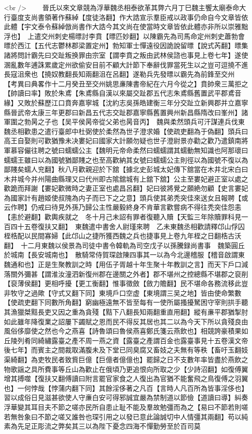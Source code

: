 <br />
　　晉氏以來文章競為浮華魏丞相泰欲革其弊六月丁巳魏主饗太廟泰命大行臺度支尚書領著作蘇綽【度徒洛翻】作大誥宣示羣臣戒以政事仍命自今文章皆依此體【宇文泰令蘇綽倣尚書作大誥今其文尚在使當時文章皆依此體亦非所以崇雅黜浮也】　上遣交州刺史楊㬓討李賁【㬓匹妙翻】以陳霸先為司馬命定州刺史蕭勃會㬓於西江【五代志鬱林郡梁置定州】勃知軍士憚遠役因詭說留㬓【說式芮翻】㬓集諸將問計霸先曰交趾叛换罪由宗室【謂李賁之叛由武林侯諮也事見上卷七年】遂使溷亂數年逋誅累歲定州欲偷安目前不顧大計節下奉辭伐罪當死生以之豈可逗撓不進長寇沮衆也【撓奴教翻長知兩翻沮在呂翻】遂勒兵先發㬓以霸先為前鋒至交州　【考異曰典畧作十二月癸丑至交州姚思亷陳書帝紀在六月今從之】賁帥衆三萬拒之【帥讀曰率】敗於朱鳶【朱鳶縣自漢以來屬交趾郡五代志朱鳶縣舊置武平郡鳶音緣】又敗於蘇歷江口賁奔嘉寧城【沈約志吳孫皓建衡三年分交趾立新興郡并立嘉寧縣晉武帝太康三年更郡曰新昌五代志交趾郡嘉寧縣舊置興州新昌縣隋改曰峯州】諸軍圍之勃昺之子也【吴平侯昺帝從父弟也昺音丙】　魏與柔然頭兵可汗謀連兵伐東魏丞相歡患之遣行臺郎中杜弼使於柔然為世子澄求婚【使疏吏翻為于偽翻】頭兵曰高王自娶則可歡猶豫未决婁妃曰國家大計願勿疑也世子澄尉景亦勸之歡乃遣鎮南將軍慕容儼往聘之號曰蠕蠕公主【魏明元帝命柔然曰蠕蠕謂其蠕動無知識也阿那瓌曰蠕蠕王雖曰以為國號猶鄙賤之也至高歡納其女號曰蠕蠕公主則徑以為國號不復以為鄙賤矣蠕人兖翻】秋八月歡親迎於下舘【據北史彭城太妃傳下舘當在木井北宋白曰木井城今并州陽曲縣理又曰代州即古隂舘城有上舘下舘】公主至婁妃避正室以處之歡跪而拜謝【婁妃歡微時之妻正室也處昌呂翻】妃曰彼將覺之願絶勿顧【史言婁妃為國家計有趙姬使叔隗為内子而已下之之意】頭兵使其弟秃突佳來送女且報聘【或云作聘】仍戒曰待見外孫乃歸公主性嚴毅終身不肯華言歡嘗病不得往秃突佳怨恚【恚於避翻】歡輿疾就之　冬十月己未詔有罪者復聽入贖【天監三年除贖罪科見一百四十五卷復扶又翻】　東魏遣中書舍人尉瑾來聘　乙未東魏丞相歡請釋邙山俘囚桎梏配以民間寡婦【此邙山之捷所獲西魏之兵也捷事見上卷九年桎之日翻梏古沃翻】　十二月東魏以侯景為司徒中書令韓軌為司空戊子以孫騰録尚書事　魏築圓丘於城南【長安城南也】　散騎常侍賀琛啟陳四事其一以為今北邊稽服【稽音啟謂東魏通和也】正是生聚教訓之時【用伍子胥越十年生聚十年教訓之言】而天下戶口減落關外彌甚【謂淮汝潼泗新復州郡在邊關之外者】郡不堪州之控總縣不堪郡之裒削【裒薄侯翻】更相呼擾【更工衡翻】惟事徵斂【斂力贍翻】民不堪命各務流移此豈非牧守之過歟【守式又翻下同】東境戶口空虚【東境謂三吴之地】皆由使命繁數【使疏吏翻下同數所角翻】窮幽極遠無不皆至每有一使所屬搔擾駑困守宰則拱手聽其漁獵桀黠長吏又因之重為貪殘【黠下八翻長知兩翻重直用翻】縱有亷平郡猶掣肘如此雖年降復業之詔屢下蠲賦之恩而民不得反其居也其二以為今天下所以貪殘良由風俗侈靡使之然也今之燕喜【詩魯頌曰魯侯燕喜鄭氏箋云燕飲也】相競誇豪積果如丘陵列肴同綺繡露臺之產不周一燕之資【露臺之產謂百金也露臺事見十五卷漢文帝後七年】而賓主之間裁取滿腹未及下堂已同臭腐又畜妓之夫無有等秩【畜吁玉翻妓渠綺翻】為吏牧民者致貲巨億【巨億者億億也】罷歸之日不支數年率皆盡於燕飲之物歌謡之具所費事等丘山為歡止在俄頃乃更追恨向所取之少【少詩沼翻】如復傅翼增其搏噬【復扶又翻傅讀曰附言罷官家食之人復出為官猶不能奮飛之鳥復傅之羽翼也】一何悖哉【悖蒲内翻下同】其餘淫侈著之凡百【言時人凡百所為皆事淫侈也】習以成俗日見滋甚欲使人守亷白安可得邪誠宜嚴為禁制道以節儉【道讀曰導】糾奏浮華變其耳目夫不節之嗟亦民所自患止耻不能及羣故勉彊而為之【易曰不節若則嗟若無咎象曰不節之嗟又誰咎也琛引用之以發已意此論誠切中人情彊其兩翻】苟以純素為先足正彫流之弊矣其三以為陛下憂念四海不憚勤勞至於百司莫